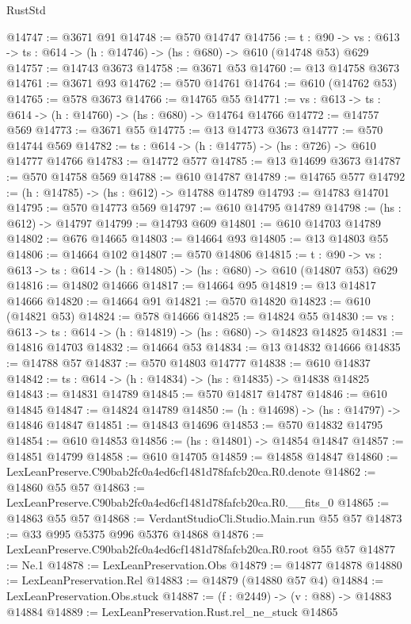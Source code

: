\begin{lexlean}{RustStd}
\begin{coremodule}
@14747 := @3671 @91
@14748 := @570 @14747
@14756 := {t : @90} ->
  {vs : @613} -> {ts : @614} -> (h : @14746) -> (hs : @680) -> @610 (@14748 @53) @629
@14757 := @14743 @3673
@14758 := @3671 @53
@14760 := @13 @14758 @3673
@14761 := @3671 @93
@14762 := @570 @14761
@14764 := @610 (@14762 @53)
@14765 := @578 @3673
@14766 := @14765 @55
@14771 := {vs : @613} -> {ts : @614} -> (h : @14760) -> (hs : @680) -> @14764 @14766
@14772 := @14757 @569
@14773 := @3671 @55
@14775 := @13 @14773 @3673
@14777 := @570 @14744 @569
@14782 := {ts : @614} -> (h : @14775) -> (hs : @726) -> @610 @14777 @14766
@14783 := @14772 @577
@14785 := @13 @14699 @3673
@14787 := @570 @14758 @569
@14788 := @610 @14787
@14789 := @14765 @577
@14792 := (h : @14785) -> (hs : @612) -> @14788 @14789
@14793 := @14783 @14701
@14795 := @570 @14773 @569
@14797 := @610 @14795 @14789
@14798 := (hs : @612) -> @14797
@14799 := @14793 @609
@14801 := @610 @14703 @14789
@14802 := @676 @14665
@14803 := @14664 @93
@14805 := @13 @14803 @55
@14806 := @14664 @102
@14807 := @570 @14806
@14815 := {t : @90} ->
  {vs : @613} -> {ts : @614} -> (h : @14805) -> (hs : @680) -> @610 (@14807 @53) @629
@14816 := @14802 @14666
@14817 := @14664 @95
@14819 := @13 @14817 @14666
@14820 := @14664 @91
@14821 := @570 @14820
@14823 := @610 (@14821 @53)
@14824 := @578 @14666
@14825 := @14824 @55
@14830 := {vs : @613} -> {ts : @614} -> (h : @14819) -> (hs : @680) -> @14823 @14825
@14831 := @14816 @14703
@14832 := @14664 @53
@14834 := @13 @14832 @14666
@14835 := @14788 @57
@14837 := @570 @14803 @14777
@14838 := @610 @14837
@14842 := {ts : @614} -> (h : @14834) -> (hs : @14835) -> @14838 @14825
@14843 := @14831 @14789
@14845 := @570 @14817 @14787
@14846 := @610 @14845
@14847 := @14824 @14789
@14850 := (h : @14698) -> (hs : @14797) -> @14846 @14847
@14851 := @14843 @14696
@14853 := @570 @14832 @14795
@14854 := @610 @14853
@14856 := (hs : @14801) -> @14854 @14847
@14857 := @14851 @14799
@14858 := @610 @14705
@14859 := @14858 @14847
@14860 := LexLeanPreserve.C90bab2fc0a4ed6cf1481d78fafcb20ca.R0.denote
@14862 := @14860 @55 @57
@14863 := LexLeanPreserve.C90bab2fc0a4ed6cf1481d78fafcb20ca.R0.__fits_0
@14865 := @14863 @55 @57
@14868 := VerdantStudioCli.Studio.Main.run @55 @57
@14873 := @33 @995 @5375 @996 @5376 @14868
@14876 := LexLeanPreserve.C90bab2fc0a4ed6cf1481d78fafcb20ca.R0.root @55 @57
@14877 := Ne.{1}
@14878 := LexLeanPreservation.Obs
@14879 := @14877 @14878
@14880 := LexLeanPreservation.Rel
@14883 := @14879 (@14880 @57 @4)
@14884 := LexLeanPreservation.Obs.stuck
@14887 := (f : @2449) -> (v : @88) -> @14883 @14884
@14889 := LexLeanPreservation.Rust.rel_ne_stuck @14865

\end{coremodule}
\end{lexlean}
